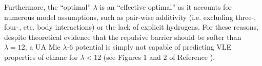 \documentclass[preprint,letterpaper,floatfix,citeautoscript,aip,jcp]{revtex4-1}
\begin{document}
Furthermore, the ``optimal'' $\lambda$ is an ``effective optimal'' as it accounts for numerous model assumptions, such as pair-wise additivity (i.e. excluding three-, four-, etc. body interactions) or the lack of explicit hydrogens. For these reasons, despite theoretical evidence that the repulsive barrier should be softer than $\lambda = 12$, a UA Mie $\lambda$-6 potential is simply not capable of predicting VLE properties of ethane for $\lambda < 12$ (see Figures 1 and 2 of Reference ).






\end{document}
